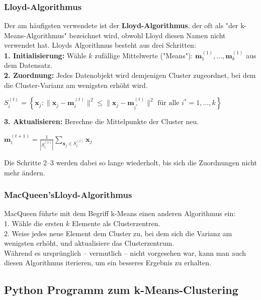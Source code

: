 \documentclass[12pt]{article}
\begin{document}
\subsubsection{Lloyd-Algorithmus}

Der am häufigsten verwendete {\color{blue}{k-Means-Algorithmus}}  ist der \textbf{Lloyd-Algorithmus}, der oft als "der k-Means-Algorithmus" bezeichnet wird, obwohl Lloyd diesen Namen nicht verwendet hat. Lloyds Algorithmus besteht aus drei Schritten:\\[0.2cm]
\textbf{1. Initialisierung:} Wähle $k$ zufällige Mittelwerte ("Means"): $ \mathbf m_1^{(1)}, \ldots, \mathbf m_k^{(1)} $ aus dem Datensatz.\\
\textbf{2. Zuordnung:} Jedes Datenobjekt wird demjenigen Cluster zugeordnet, bei dem die Cluster-Varianz am wenigsten erhöht wird.
\begin{center}
$ S_i^{(t)} = \left\{ \mathbf x_j : \big\| \mathbf x_j - \mathbf m^{(t)}_i \big\|^2 \leq \big\| \mathbf x_j - \mathbf m^{(t)}_{i^*} \big\|^2 \text{ für alle }i^*=1,\ldots,k \right\}$\\[0.2cm]
\end{center}
\textbf{3. Aktualisieren:} Berechne die Mittelpunkte der Cluster neu.
\begin{center}
$ \mathbf m_i^{(t+1)} = \frac{1}{|S_i^{(t)}|} \sum_{\mathbf x_j \in S_{i}^{(t)}} \mathbf x_j  $ \\
\end{center}
Die Schritte 2–3 werden dabei so lange wiederholt, bis sich die Zuordnungen nicht mehr ändern.

\subsubsection{MacQueen'sLloyd-Algorithmus} 

MacQueen führte mit dem Begriff k-Means einen anderen Algorithmus ein:
\\[0.3cm]1. Wähle die ersten $k$ Elemente als Clusterzentren.\\
2. Weise jedes neue Element dem Cluster zu, bei dem sich die Varianz am wenigsten erhöht, und aktualisiere das Clusterzentrum.
\\[0.3cm]Während es ursprünglich – vermutlich – nicht vorgesehen war, kann man auch diesen Algorithmus iterieren, um ein besseres Ergebnis zu erhalten.

\subsection{Python Programm zum k-Means-Clustering}
\end{document}
